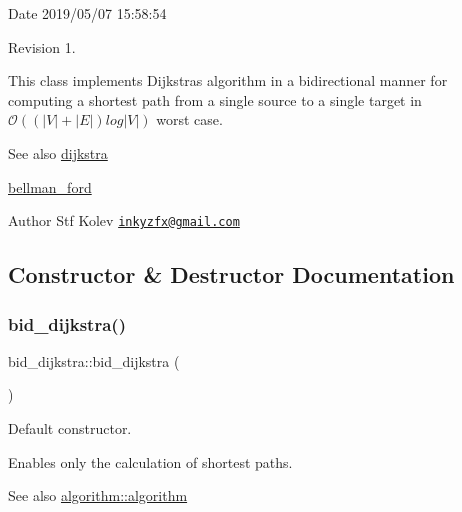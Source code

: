 \begin{DoxyParagraph}{Date}
2019/05/07 15\+:58\+:54 
\end{DoxyParagraph}
\begin{DoxyParagraph}{Revision}
1. 
\end{DoxyParagraph}


This class implements Dijkstra\textquotesingle{}s algorithm in a bidirectional manner for computing a shortest path from a single source to a single target in $\mathcal{O}((|V| + |E|) log |V|)$ worst case.

\begin{DoxySeeAlso}{See also}
\mbox{\hyperlink{classdijkstra}{dijkstra}} 

\mbox{\hyperlink{classbellman__ford}{bellman\+\_\+ford}}
\end{DoxySeeAlso}
\begin{DoxyAuthor}{Author}
Stf Kolev \href{mailto:inkyzfx@gmail.com}{\tt inkyzfx@gmail.\+com} 
\end{DoxyAuthor}


\subsection{Constructor \& Destructor Documentation}
\mbox{\label{classbid__dijkstra_a1f9ddd95b88b24f45afe0966c2ae181b}} 
\subsubsection{\texorpdfstring{bid\+\_\+dijkstra()}{bid\_dijkstra()}}
{\footnotesize\ttfamily bid\+\_\+dijkstra\+::bid\+\_\+dijkstra (\begin{DoxyParamCaption}{ }\end{DoxyParamCaption})}



Default constructor. 

Enables only the calculation of shortest paths.

\begin{DoxySeeAlso}{See also}
\mbox{\hyperlink{classalgorithm_ab79e1ddec2f2afdf4b36b10724db8b15}{algorithm\+::algorithm}} 
\end{DoxySeeAlso}
\mbox{\label{classbid__dijkstra_a3d46b327a3a87ac874e3930227a13757}} 
